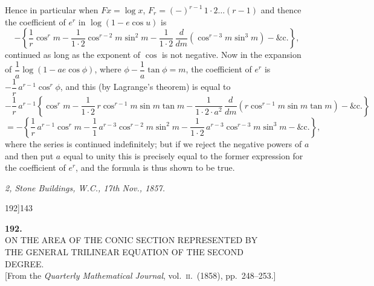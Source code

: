 \documentclass[11pt]{article}
\begin{document}
\noindent Hence in particular when $Fx = \log x$, $F_{r} = (-)^{r-1}\, 1\cdot 2\dots (r-1)$ and thence the coefficient of $e^{r}$ in $\log(1 - e\cos u)$ is
\[
- \left\{ \frac{1}{r}\cos^{r} m - \frac{1}{1\cdot 2}\cos^{r-2} m\sin^{2} m - \frac{1}{1\cdot 2}\, \frac{d}{dm}(\cos^{r-3} m\sin^{3} m) - \&\text{c.} \right\},
\]
continued as long as the exponent of $\cos$ is not negative. Now in the expansion of $\dfrac{1}{a}\log(1 - ae\cos\phi)$, where $\phi - \dfrac{1}{a}\tan\phi = m$, the coefficient of $e^{r}$ is $-\dfrac{1}{r}\, a^{r-1}\cos^{r}\phi$, and this (by Lagrange's theorem) is equal to
\[
- \frac{1}{r}\, a^{r-1}\!\left\{\cos^{r} m - \frac{1}{1\cdot 2}\, r\cos^{r-1} m\sin m\tan m - \frac{1}{1\cdot 2\cdot a^{2}}\, \frac{d}{dm}(r\cos^{r-1} m\sin m\tan m) - \&\text{c.}\right\}
\]
\[
= - \left\{ \frac{1}{r}\, a^{r-1}\cos^{r} m - \frac{1}{1}\, a^{r-3}\cos^{r-2} m\sin^{2} m - \frac{1}{1\cdot 2}\, a^{r-3}\cos^{r-3} m\sin^{3} m - \&\text{c.}\right\},
\]
where the series is continued indefinitely; but if we reject the negative powers of $a$ and then put $a$ equal to unity this is precisely equal to the former expression for the coefficient of $e^{r}$, and the formula is thus shown to be true.

\medskip

\noindent\emph{2, Stone Buildings, W.C., 17th Nov., 1857.}

\bigskip

\begin{center}\small 192]\hfill\hfill 143\end{center}

\bigskip
\bigskip

\begin{center}
{\Large\bfseries 192.}\\[10pt]
{\large ON THE AREA OF THE CONIC SECTION REPRESENTED BY\\
THE GENERAL TRILINEAR EQUATION OF THE SECOND\\
DEGREE.}\\[6pt]
\small [From the \emph{Quarterly Mathematical Journal}, vol.~\textsc{ii}.\ (1858), pp.~248--253.]
\end{center}

\bigskip
\end{document}
